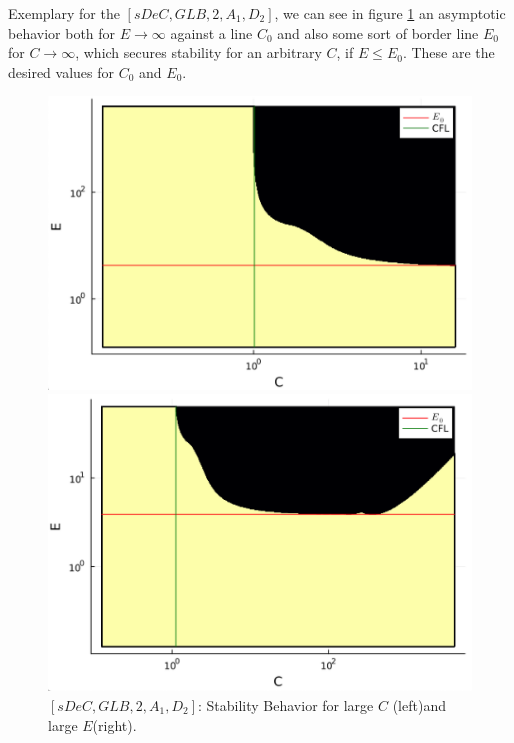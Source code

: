 Exemplary for the $[sDeC,GLB,2, A_1,D_2]$, we can see in figure \ref{fig: exa_limits} an asymptotic behavior both for $E\rightarrow \infty$ against a line $C_0$ and also some sort of border line $E_0$ for $C\rightarrow \infty$, which secures stability for an arbitrary $C$, if $E\le E_0$. These are the desired values for $C_0$ and $E_0$.\\
\begin{figure}[!h]
	\centering
	\begin{minipage}[t]{0.45\textwidth}
		\includegraphics[width=\textwidth]{pdepics/IMEXsDeC2_GLB_diff2_adv1_C_log.png}
	\end{minipage} 
	\begin{minipage}[t]{0.45\textwidth}
		\includegraphics[width=\textwidth]{pdepics/IMEXsDeC2_GLB_diff2_adv1_E_log.png}
	\end{minipage}
	\caption{$[sDeC,GLB,2, A_1,D_2]$: Stability Behavior for large $C$ (left)and large $E$(right).}
	\label{fig: exa_limits}
\end{figure}

